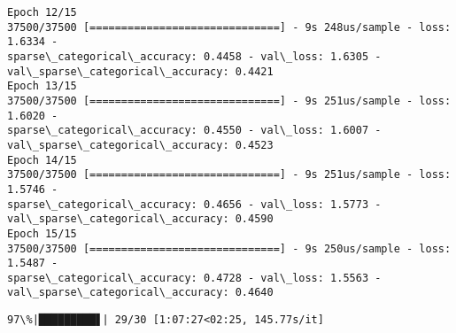 \documentclass[11pt]{article}
\begin{document}
\begin{Verbatim}[commandchars=\\\{\}]
Epoch 12/15
37500/37500 [==============================] - 9s 248us/sample - loss: 1.6334 -
sparse\_categorical\_accuracy: 0.4458 - val\_loss: 1.6305 -
val\_sparse\_categorical\_accuracy: 0.4421
Epoch 13/15
37500/37500 [==============================] - 9s 251us/sample - loss: 1.6020 -
sparse\_categorical\_accuracy: 0.4550 - val\_loss: 1.6007 -
val\_sparse\_categorical\_accuracy: 0.4523
Epoch 14/15
37500/37500 [==============================] - 9s 251us/sample - loss: 1.5746 -
sparse\_categorical\_accuracy: 0.4656 - val\_loss: 1.5773 -
val\_sparse\_categorical\_accuracy: 0.4590
Epoch 15/15
37500/37500 [==============================] - 9s 250us/sample - loss: 1.5487 -
sparse\_categorical\_accuracy: 0.4728 - val\_loss: 1.5563 -
val\_sparse\_categorical\_accuracy: 0.4640
    \end{Verbatim}

    \begin{Verbatim}[commandchars=\\\{\}]
 97\%|█████████▋| 29/30 [1:07:27<02:25, 145.77s/it]
    \end{Verbatim}
\end{document}
